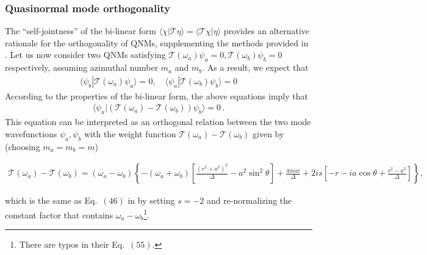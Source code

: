 \documentclass[aps,prd,amsmath,floats,floatfix, twocolumn,
superscriptaddress,nofootinbib,showpacs]{revtex4-1}
\begin{document}
\subsubsection{Quasinormal mode orthogonality}
\label{subsubsec:qnm_orthogonality}
The ``self-jointness'' of the bi-linear form $\langle \chi | \mathcal{T} \eta\rangle =\langle  \mathcal{T \chi | \eta\rangle }$ provides an alternative rationale for the orthogonality of QNMs, supplementing the methods provided in \cite{Green:2022htq}.
Let us now consider two QNMs satisfying $\mathcal{T}(\omega_a) \psi_a=0, \mathcal{T}(\omega_b) \psi_b=0$ respectively, assuming  azimuthal number $m_a$ and $m_b$. As a result, we expect that
\begin{align}
\langle \psi_b | \mathcal{T}(\omega_a) \psi_a \rangle =0, \quad \langle \psi_a | \mathcal{T}(\omega_b) \psi_b \rangle =0
\end{align}
According to the properties of the bi-linear form, the above equations imply that
\begin{align}
\langle \psi_a | (\mathcal{T}(\omega_a)-\mathcal{T}(\omega_b)) \psi_b \rangle =0\,.
\end{align}
This equation can be interpreted as an orthogonal relation between the two mode wavefunctions $\psi_a, \psi_b$ with the weight function $\mathcal{T}(\omega_a)-\mathcal{T}(\omega_b)$ given by (choosing $m_a=m_b=m$)
\begin{widetext} 
\begin{align}
\mathcal{T}(\omega_a)-\mathcal{T}(\omega_b) =(\omega_a-\omega_b) \left \{-(\omega_a+\omega_b) \left [ \frac{(r^2+a^2)^2}{\Delta}-a^2\sin^2\theta\right ] +\frac{4  m a r}{\Delta }+2 i s  \left [-r-i a \cos\theta + \frac{r^2-a^2}{\Delta}\right ]\right \},
\end{align}
\end{widetext}
which is the same as Eq.~$(46)$ in \cite{Green:2022htq} by setting $s=-2$ and re-normalizing the constant factor that contains $\omega_a-\omega_b$\footnote{There are typos in their Eq.~$(55)$.}. 
\end{document}
